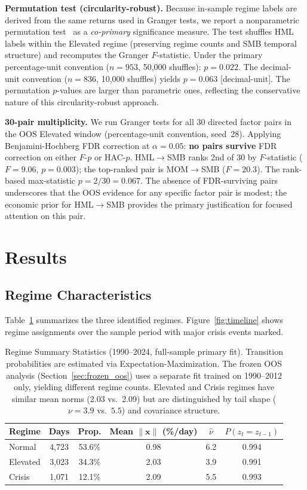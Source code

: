 \documentclass[sigconf,anonymous]{acmart}
\begin{document}
\textbf{Permutation test (circularity-robust).} Because in-sample regime labels
are derived from the same returns used in Granger tests, we report a
nonparametric permutation test~\cite{good2005permutation} as a
\emph{co-primary} significance measure. The test shuffles HML labels within
the Elevated regime (preserving regime counts and SMB temporal structure)
and recomputes the Granger $F$-statistic.
Under the primary percentage-unit convention ($n = 953$,
50{,}000 shuffles): $p = 0.022$. The decimal-unit convention
($n = 836$, 10{,}000 shuffles) yields $p = 0.063$ [decimal-unit].
The permutation $p$-values are larger than parametric ones, reflecting
the conservative nature of this circularity-robust approach.

\textbf{30-pair multiplicity.} We run Granger tests for all 30 directed factor pairs
in the OOS Elevated window (percentage-unit convention, seed~28).
Applying Benjamini-Hochberg FDR correction at $\alpha = 0.05$:
\textbf{no pairs survive} FDR correction on either $F$-$p$ or HAC-$p$.
HML$\to$SMB ranks 2nd of 30 by $F$-statistic
($F = 9.06$, $p = 0.003$); the top-ranked pair is MOM$\to$SMB ($F = 20.3$).
The rank-based max-statistic $p = 2/30 = 0.067$.
The absence of FDR-surviving pairs underscores that the OOS evidence for any
specific factor pair is modest; the economic prior for HML$\to$SMB provides the
primary justification for focused attention on this pair.

\section{Results}

\subsection{Regime Characteristics}

Table~\ref{tab:regimes} summarizes the three identified regimes. Figure~\ref{fig:timeline}
shows regime assignments over the sample period with major crisis events marked.

\begin{table}[t]
\centering
\caption[Regime statistics]{Regime Summary Statistics (1990--2024, full-sample primary fit). Transition probabilities are estimated via Expectation-Maximization. The frozen OOS analysis (Section~\ref{sec:frozen_oos}) uses a separate fit trained on 1990--2012 only, yielding different regime counts. Elevated and Crisis regimes have similar mean norms (2.03 vs.\ 2.09) but are distinguished by tail shape ($\nu = 3.9$ vs.\ $5.5$) and covariance structure.}
\label{tab:regimes}
\small
\setlength{\tabcolsep}{4pt}
\begin{tabular}{lccccc}
\toprule
Regime & Days & Prop. & Mean $\|\mathbf{x}\|$ (\%/day) & $\hat{\nu}$ & $P(z_t=z_{t-1})$ \\
\midrule
Normal & 4,723 & 53.6\% & 0.98 & 6.2 & 0.994 \\
Elevated & 3,023 & 34.3\% & 2.03 & 3.9 & 0.991 \\
Crisis & 1,071 & 12.1\% & 2.09 & 5.5 & 0.993 \\
\bottomrule
\end{tabular}
\setlength{\tabcolsep}{6pt}
\end{table}
\end{document}
